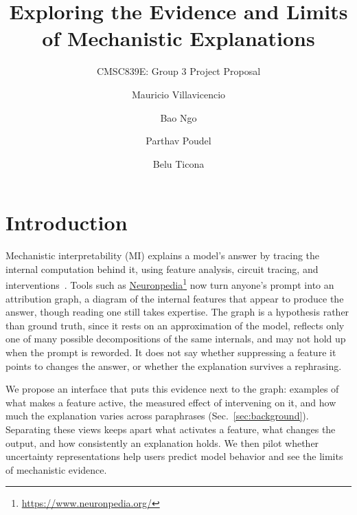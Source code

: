 \documentclass[sigconf,balance=false]{acmart}
\begin{document}
\title{Exploring the Evidence and Limits of Mechanistic Explanations}
\subtitle{CMSC839E: Group 3 Project Proposal}

\author{Mauricio Villavicencio}

\author{Bao Ngo}

\author{Parthav Poudel}

\author{Belu Ticona}

\newcommand{\guideline}[1]{\textit{\color{paperblue}{#1}}}
\maketitle




\section{Introduction}
Mechanistic interpretability (MI) explains a model's answer by tracing the internal computation behind it, using feature analysis, circuit tracing, and interventions~\cite{sharkey2025open}. Tools such as \href{https://www.neuronpedia.org/}{Neuronpedia}\footnote{\url{https://www.neuronpedia.org/}} now turn anyone's prompt into an attribution graph, a diagram of the internal features that appear to produce the answer, though reading one still takes expertise. The graph is a hypothesis rather than ground truth, since it rests on an approximation of the model, reflects only one of many possible decompositions of the same internals, and may not hold up when the prompt is reworded. It does not say whether suppressing a feature it points to changes the answer, or whether the explanation survives a rephrasing.

We propose an interface that puts this evidence next to the graph: examples of what makes a feature active, the measured effect of intervening on it, and how much the explanation varies across paraphrases (Sec.~\ref{sec:background}). Separating these views keeps apart what activates a feature, what changes the output, and how consistently an explanation holds. We then pilot whether uncertainty representations help users predict model behavior and see the limits of mechanistic evidence.
\end{document}
